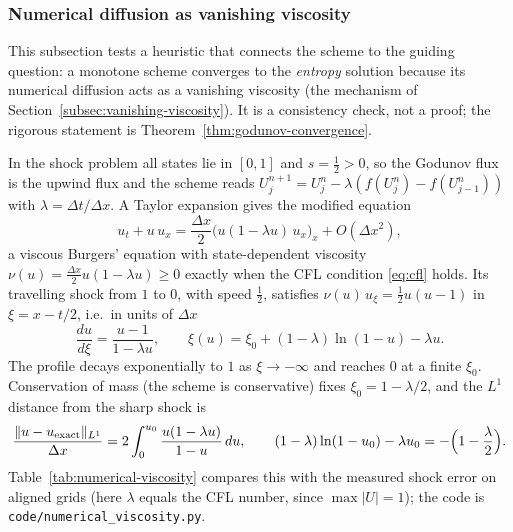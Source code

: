 \subsubsection{Numerical diffusion as vanishing viscosity}
\label{subsubsec:numerical-viscosity}

This subsection tests a heuristic that connects the scheme to the guiding
question: a monotone scheme converges to the \emph{entropy} solution because
its numerical diffusion acts as a vanishing viscosity (the mechanism of
Section~\ref{subsec:vanishing-viscosity}). It is a consistency check, not a
proof; the rigorous statement is Theorem~\ref{thm:godunov-convergence}.

In the shock problem all states lie in $[0,1]$ and $s=\tfrac12>0$, so the
Godunov flux is the upwind flux and the scheme reads $U_j^{n+1}=U_j^n-
\lambda(f(U_j^n)-f(U_{j-1}^n))$ with $\lambda=\Delta t/\Delta x$. A Taylor
expansion gives the modified equation
\begin{equation}
  \label{eq:modified-equation}
  u_t+u\,u_x=\frac{\Delta x}{2}\big(u(1-\lambda u)\,u_x\big)_x+O(\Delta x^2),
\end{equation}
a viscous Burgers' equation with state-dependent viscosity
$\nu(u)=\tfrac{\Delta x}2u(1-\lambda u)\ge0$ exactly when the CFL condition
\eqref{eq:cfl} holds. Its travelling shock from $1$ to $0$, with speed
$\tfrac12$, satisfies $\nu(u)\,u_\xi=\tfrac12u(u-1)$ in $\xi=x-t/2$, i.e.\ in
units of $\Delta x$
\begin{equation}
  \frac{du}{d\xi}=\frac{u-1}{1-\lambda u},\qquad
  \xi(u)=\xi_0+(1-\lambda)\ln(1-u)-\lambda u .
\end{equation}
The profile decays exponentially to $1$ as $\xi\to-\infty$ and reaches $0$ at
a finite $\xi_0$. Conservation of mass (the scheme is conservative) fixes
$\xi_0=1-\lambda/2$, and the $L^1$ distance from the sharp shock is
\begin{equation}
  \frac{\|u-u_{\rm exact}\|_{L^1}}{\Delta x}
  =2\int_0^{u_0}\frac{u(1-\lambda u)}{1-u}\,du,\qquad
  (1-\lambda)\ln(1-u_0)-\lambda u_0=-\Big(1-\frac\lambda2\Big).
\end{equation}
Table~\ref{tab:numerical-viscosity} compares this with the measured shock
error on aligned grids (here $\lambda$ equals the CFL number, since
$\max|U|=1$); the code is \texttt{code/numerical\_viscosity.py}.

